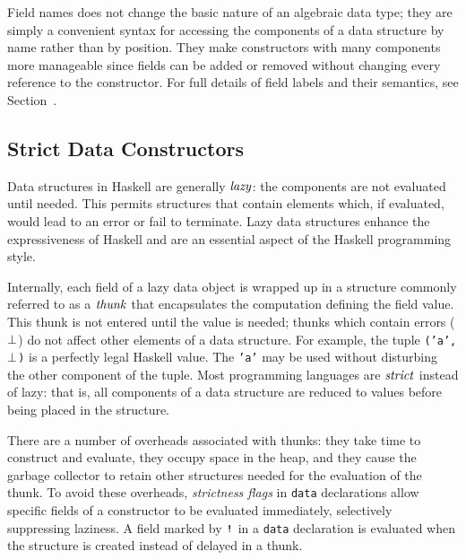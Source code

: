 Field names does not change the basic nature of an algebraic
data type; they are simply a convenient syntax for accessing the
components of a data structure by name rather than by position.  They
make constructors with many components 
more manageable since fields can be added or removed without changing
every reference to the constructor.  For full details of field labels
and their semantics, see Section~.

\subsection{Strict Data Constructors}
\label{tut-strict-flag}
Data structures in Haskell are generally \mbox{$\it lazy$}: the
components are not evaluated until 
needed.  This permits structures that contain elements which, if
evaluated, would lead to an error or fail to terminate.  Lazy data
structures enhance the expressiveness of Haskell and are an
essential aspect of the Haskell programming style.

Internally, each field of a lazy data object is wrapped up in a structure
commonly referred to as a \mbox{$\it thunk$} that encapsulates the computation
defining the field value.  This thunk is not entered until
the value is needed; thunks which contain errors (\mbox{$\it \bot$}) do not affect other
elements of a data structure.   For 
example, the tuple \mbox{\tt ('a',}\mbox{$\it \bot$}\mbox{\tt )} is a perfectly legal Haskell
value.  The
\mbox{\tt 'a'} may be used without disturbing the other component of the tuple.
Most programming languages are 
\mbox{$\it strict$} instead of lazy: that is, all components of a data structure
are reduced to values before being placed in the structure.

There are a number of overheads associated with thunks: they take time to
construct and evaluate, they occupy space in the heap, and they cause
the garbage collector to retain other structures needed for the
evaluation of the thunk.  
To avoid these overheads, {\em strictness flags} in \mbox{\tt data} declarations
allow specific fields of a constructor to be evaluated immediately,
selectively suppressing laziness.  A field
marked by \mbox{$\it \makebox{\tt !}$} in a \mbox{\tt data} declaration is evaluated when
the structure is created instead of delayed in a thunk.
 
